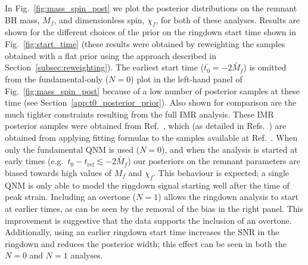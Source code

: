 In Fig.~\ref{fig:mass_spin_post} we plot the posterior distributions on the remnant BH mass, $M_f$, and dimensionless spin, $\chi_f$, for both of these analyses.
Results are shown for the different choices of the prior on the ringdown start time shown in Fig.~\ref{fig:start_time} (these results were obtained by reweighting the samples obtained with a flat prior using the approach described in Section~\ref{subsec:reweighting}).
The earliest start time ($\bar{t_0}=-2\tilde{M_f}$) is omitted from the fundamental-only ($N=0$) plot in the left-hand panel of Fig.~\ref{fig:mass_spin_post} because of a low number of posterior samples at these time (see Section~\ref{app:t0_posterior_prior}).
Also shown for comparison are the much tighter constraints resulting from the full IMR analysis.
These IMR posterior samples were obtained from Ref.~\cite{maximiliano_isi_2022_5965773}, which (as detailed in Refs.~\cite{Isi:2019aib,Isi:2022mhy}) are obtained from applying fitting formulas to the samples available at Ref.~\cite{gwtc1datarelease}. 
When only the fundamental QNM is used ($N=0$), and when the analysis is started at early times (e.g.\ $t_0 - t_\mathrm{ref}\lesssim -2\tilde{M_f}$) our posteriors on the remnant parameters are biased towards high values of $M_f$ and $\chi_f$.
This behaviour is expected; a single QNM is only able to model the ringdown signal starting well after the time of peak strain.
Including an overtone ($N=1$) allows the ringdown analysis to start at earlier times, as can be seen by the removal of the bias in the right panel. 
This improvement is suggestive that the data supports the inclusion of an overtone.
Additionally, using an earlier ringdown start time increases the SNR in the ringdown and reduces the posterior width; this effect can be seen in both the $N=0$ and $N=1$ analyses.

